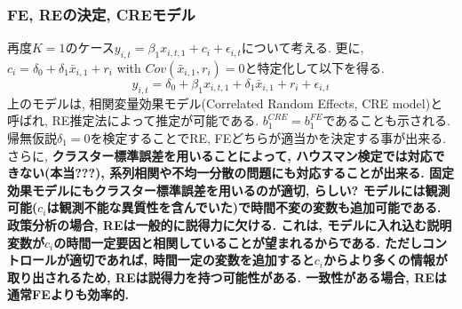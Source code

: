 \documentclass[paper=a4paper,fontsize=10pt]{jlreq}
\begin{document}
\subsubsection{FE, REの決定, CREモデル}
再度$K = 1$のケース$y_{i,t} = \beta_1 {x}_{i,t,1} + c_i + \epsilon_{i,t}$について考える. 更に, $c_i = \delta_0 + \delta_1 \bar{{x}}_{i,1} + r_i$ with $Cov(\bar{{x}}_{i,1}, r_i) = 0$と特定化して以下を得る.
\begin{equation*}
  y_{i,t} = \delta_0 + \beta_1 {x}_{i,t,1} + \delta_1 \bar{{x}}_{i,1} + r_i + \epsilon_{i,t}
\end{equation*}
上のモデルは, 相関変量効果モデル(Correlated Random Effects, CRE model)と呼ばれ, RE推定法によって推定が可能である. $b_1^{CRE} = b_1^{FE}$であることも示される. 帰無仮説$\delta_1 = 0$を検定することでRE, FEどちらが適当かを決定する事が出来る. さらに, \rmfamily\mcfamily\bfseries{クラスター標準誤差}\mdseries を用いることによって, \rmfamily\mcfamily\bfseries{ハウスマン検定では対応できない(本当???)}\mdseries , 系列相関や不均一分散の問題にも対応することが出来る. 固定効果モデルにもクラスター標準誤差を用いるのが適切, らしい? モデルには観測可能($c_i$は観測不能な異質性を含んでいた)で時間不変の変数も追加可能である. 政策分析の場合, REは一般的に説得力に欠ける. これは, モデルに入れ込む説明変数が$c_i$の時間一定要因と相関していることが望まれるからである. ただしコントロールが適切であれば, 時間一定の変数を追加すると$c_i$からより多くの情報が取り出されるため, REは説得力を持つ可能性がある. 一致性がある場合, REは通常FEよりも効率的.
\end{document}
